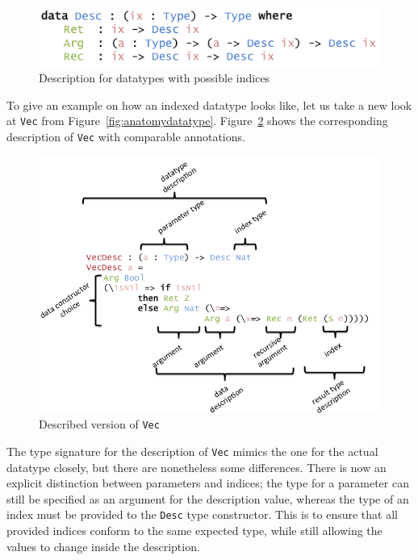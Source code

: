 \documentclass{ituthesis}
\newcommand{\tttype}[1]{\textcolor{type-color}{\texttt{#1}}}
\theoremstyle{break}
\begin{document}
\begin{figure}[ht]
\begin{center}
    \includegraphics[scale=0.5]{Figures/ADescriptionforDatatypes.png}
\end{center}
\caption{Description for datatypes with possible indices}
\label{fig:descriptiondatatype}
\end{figure}

To give an example on how an indexed datatype looks like, let us take a new look at \tttype{Vec} from Figure~\ref{fig:anatomydatatype}.
Figure~\ref{fig:descvec} shows the corresponding description of \tttype{Vec} with comparable annotations.

\begin{figure}[ht]
\begin{center}
    \includegraphics[scale=0.5]{Figures/VectorDescription.png}
\end{center}
\caption{Described version of \tttype{Vec}}
\label{fig:descvec}
\end{figure}


The type signature for the description of \tttype{Vec} mimics the one for the actual datatype closely, but there are nonetheless some differences.
There is now an explicit distinction between parameters and indices; the type for a parameter can still be specified as an argument for the description value,
whereas the type of an index must be provided to the \tttype{Desc} type constructor.
This is to ensure that all provided indices conform to the same expected type, while still allowing the values to change inside the description.
\end{document}
